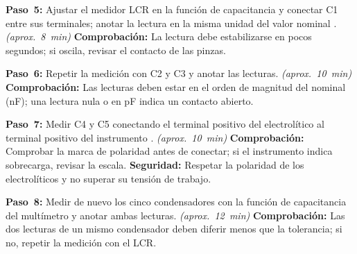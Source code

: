 \documentclass[12pt]{article}
\begin{document}
\begin{pasos}
  \item \textbf{Paso~5:} Ajustar el medidor LCR en la función de capacitancia y conectar C1 entre sus terminales; anotar la lectura en la misma unidad del valor nominal \cite{ref1}. \emph{(aprox.~\SI{8}{\minute})} \textbf{Comprobación:} La lectura debe estabilizarse en pocos segundos; si oscila, revisar el contacto de las pinzas.
  \item \textbf{Paso~6:} Repetir la medición con C2 y C3 y anotar las lecturas. \emph{(aprox.~\SI{10}{\minute})} \textbf{Comprobación:} Las lecturas deben estar en el orden de magnitud del nominal (nF); una lectura nula o en pF indica un contacto abierto.
  \item \textbf{Paso~7:} Medir C4 y C5 conectando el terminal positivo del electrolítico al terminal positivo del instrumento \cite{ref2}. \emph{(aprox.~\SI{10}{\minute})} \textbf{Comprobación:} Comprobar la marca de polaridad antes de conectar; si el instrumento indica sobrecarga, revisar la escala. \textbf{Seguridad:} Respetar la polaridad de los electrolíticos y no superar su tensión de trabajo.
  \item \textbf{Paso~8:} Medir de nuevo los cinco condensadores con la función de capacitancia del multímetro y anotar ambas lecturas. \emph{(aprox.~\SI{12}{\minute})} \textbf{Comprobación:} Las dos lecturas de un mismo condensador deben diferir menos que la tolerancia; si no, repetir la medición con el LCR.
\end{pasos}
\end{document}
